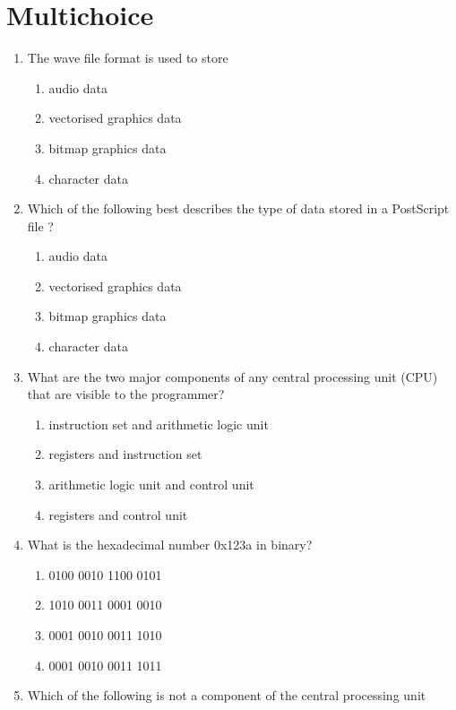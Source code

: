 \documentclass[a4paper,10pt]{article}
\begin{document}
\section{Multichoice}
\begin{enumerate}

\item The wave file format is used to store
\begin{enumerate}
  \item audio data
  \item vectorised graphics data
  \item bitmap graphics data
  \item character data
\end{enumerate}

\item Which of the following best describes the type of data stored in a
PostScript file ? 
\begin{enumerate}
  \item audio data
  \item vectorised graphics data
  \item bitmap graphics data
  \item character data
\end{enumerate}

\item What are the two major components of any central processing unit
(CPU) that are visible to the programmer? 
\begin{enumerate}
  \item instruction set and arithmetic logic unit 
  \item registers and instruction set
  \item arithmetic logic unit and control unit
  \item registers and control unit
\end{enumerate}

\item What is the hexadecimal number 0x123a in binary?
\begin{enumerate}
  \item 0100 0010 1100 0101
  \item 1010 0011 0001 0010
  \item 0001 0010 0011 1010
  \item 0001 0010 0011 1011
\end{enumerate}

\newpage
\item Which of the following is not a component of the central
processing unit


\end{enumerate}
\end{document}
